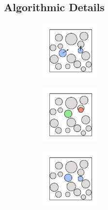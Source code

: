 \subsection{Algorithmic Details} 

\begin{figure}[bt]
     \centering
     
     \begin{subfigure}[b]{0.25\textwidth}
         \centering
         \includegraphics[width=3cm]{./figures/methods/mc_move_a.pdf}
         \caption{}
         \label{fig:hardmc1}
     \end{subfigure}
     \begin{subfigure}[b]{0.25\textwidth}
         \centering
         \includegraphics[width=3cm]{./figures/methods/mc_move_b.pdf}
         \caption{}
         \label{fig:hardmc2}
     \end{subfigure}
     \begin{subfigure}[b]{0.25\textwidth}
         \centering
         \includegraphics[width=3cm]{./figures/methods/mc_move_c.pdf}
         \caption{}
         \label{fig:hardmc3}
     \end{subfigure}
     

\end{figure}
